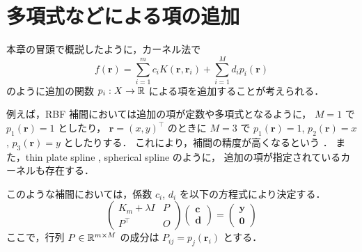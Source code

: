%

\section{多項式などによる項の追加}\label{sec:interp_kernel_additional-terms}

本章の冒頭で概説したように，カーネル法で
\begin{equation}
    f(\bm{r}) = \sum_{i=1}^m c_i K(\bm{r}, \bm{r}_i) + \sum_{i=1}^M d_i p_i(\bm{r})
\end{equation}
のように追加の関数 $p_i : X \to \mathbb{R}$ による項を追加することが考えられる．

例えば，RBF 補間においては追加の項が定数や多項式となるように，
$M = 1$ で $p_1(\bm{r}) = 1$ としたり，
$\bm{r} = (x, y)^\top$ のときに $M = 3$ で
$p_1(\bm{r}) = 1$, $p_2(\bm{r}) = x$, $p_3(\bm{r}) = y$ としたりする．
これにより，補間の精度が高くなるという
\cite[Section 3.1.3.5]{Fornberg2015}．
また，thin plate spline \cite{Ghosh2010}, spherical spline \cite{Wahba1981} のように，
追加の項が指定されているカーネルも存在する．

このような補間においては，係数 $c_i$, $d_i$ を以下の方程式により決定する．
\begin{equation}
    \begin{pmatrix}
        K_m + \lambda I & P \\
        P^\top          & O
    \end{pmatrix}
    \begin{pmatrix}
        \bm{c} \\ \bm{d}
    \end{pmatrix}
    =
    \begin{pmatrix}
        \bm{y} \\ \bm{0}
    \end{pmatrix}
\end{equation}
ここで，行列 $P \in \mathbb{R}^{m \times M}$ の成分は $P_{ij} = p_j(\bm{r}_i)$ とする．
